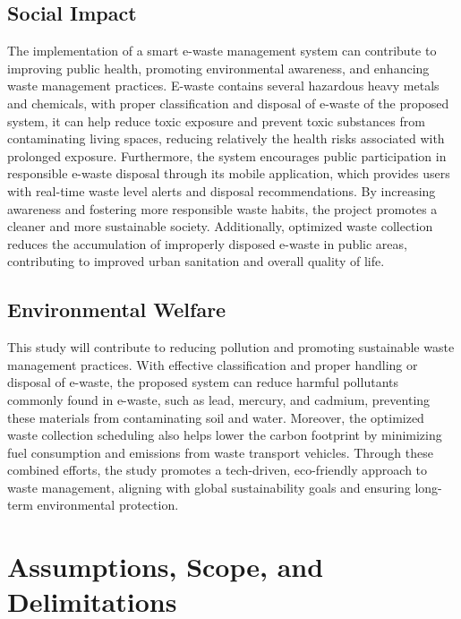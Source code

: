 \subsection{Social Impact}

The implementation of a smart e-waste management system can contribute to  improving public health, promoting environmental awareness, and enhancing waste management practices. E-waste contains several hazardous heavy metals and chemicals, with proper classification and disposal of e-waste of the proposed system, it can help reduce toxic exposure and prevent toxic substances from contaminating living spaces, reducing relatively the health risks associated with prolonged exposure. Furthermore, the system encourages public participation in responsible e-waste disposal through its mobile application, which provides users with real-time waste level alerts and disposal recommendations. By increasing awareness and fostering more responsible waste habits, the project promotes a cleaner and more sustainable society. Additionally, optimized waste collection reduces the accumulation of improperly disposed e-waste in public areas, contributing to improved urban sanitation and overall quality of life.

\subsection{Environmental Welfare}

This study will contribute to reducing pollution and promoting sustainable waste management practices. With effective classification and proper handling or disposal of e-waste, the proposed system can reduce harmful pollutants commonly found in e-waste, such as lead, mercury, and cadmium, preventing these materials from contaminating soil and water. Moreover, the optimized waste collection scheduling also helps lower the carbon footprint by minimizing fuel consumption and emissions from waste transport vehicles. Through these combined efforts, the study promotes a tech-driven, eco-friendly approach to waste management, aligning with global sustainability goals and ensuring long-term environmental protection.

\section{Assumptions, Scope, and Delimitations}


